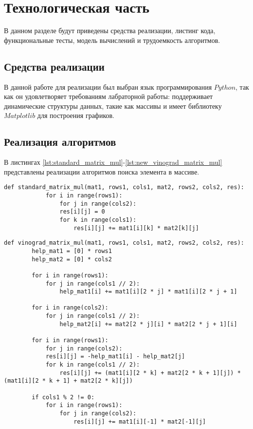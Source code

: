 \chapter{Технологическая часть}
В данном разделе будут приведены средства реализации, листинг кода, функциональные тесты, модель вычислений и трудоемкость алгоритмов.

\section{Средства реализации}
В данной работе для реализации был выбран язык программирования $Python$\cite{python-city}, так как он удовлетворяет требованиям лабраторной работы: поддерживает динамические структуры данных,
такие как массивы и имеет библиотеку $Matplotlib$\cite{matplotlib-lib} для построения графиков.


\section{Реализация алгоритмов}
В листингах \ref{lst:standard_matrix_mul}-\ref{lst:new_vinograd_matrix_mul} представлены реализации алгоритмов поиска элемента в массиве.

\begin{center}
	\captionsetup{justification=raggedright,singlelinecheck=off}
	\renewcommand{\lstlistingname}{Листинг}
	\begin{lstlisting}[label=lst:standard_matrix_mul,caption=Стандартный алгоритм умножения матриц]
		def standard_matrix_mul(mat1, rows1, cols1, mat2, rows2, cols2, res):
			for i in range(rows1):
				for j in range(cols2):
				res[i][j] = 0
				for k in range(cols1):
					res[i][j] += mat1[i][k] * mat2[k][j]
	\end{lstlisting}
\end{center}

\begin{center}
	\captionsetup{justification=raggedright,singlelinecheck=off}
	\renewcommand{\lstlistingname}{Листинг}
	\begin{lstlisting}[label=lst:vinograd_matrix_mul, caption=Алгоритм Винограда]
	def vinograd_matrix_mul(mat1, rows1, cols1, mat2, rows2, cols2, res):
		help_mat1 = [0] * rows1
		help_mat2 = [0] * cols2
		
		for i in range(rows1):
			for j in range(cols1 // 2):
				help_mat1[i] += mat1[i][2 * j] * mat1[i][2 * j + 1]
		
		for i in range(cols2):
			for j in range(cols1 // 2):
				help_mat2[i] += mat2[2 * j][i] * mat2[2 * j + 1][i]
		
		for i in range(rows1):
			for j in range(cols2):
			res[i][j] = -help_mat1[i] - help_mat2[j]
			for k in range(cols1 // 2):
				res[i][j] += (mat1[i][2 * k] + mat2[2 * k + 1][j]) * (mat1[i][2 * k + 1] + mat2[2 * k][j])
			
		if cols1 % 2 != 0:
			for i in range(rows1):
				for j in range(cols2):
					res[i][j] += mat1[i][-1] * mat2[-1][j]
	\end{lstlisting}
\end{center}

